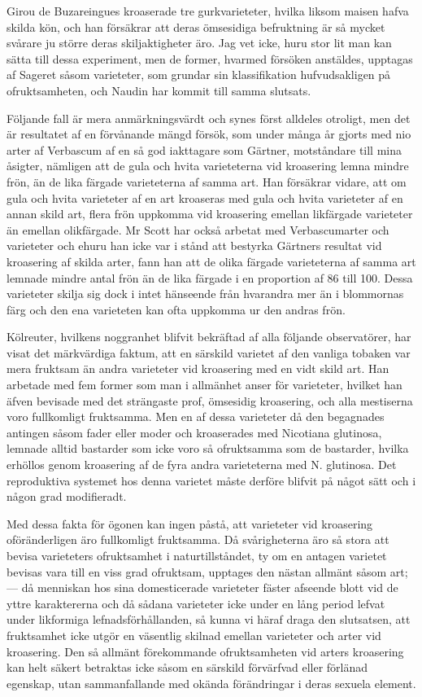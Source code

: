 Girou de Buzareingues kroaserade tre gurkvarieteter, hvilka liksom maisen hafva skilda kön, och han försäkrar att deras ömsesidiga befruktning är så mycket svårare ju större deras skiljaktigheter äro. Jag vet icke, huru stor lit man kan sätta till dessa experiment, men de former, hvarmed försöken anstäldes, upptagas af Sageret såsom varieteter, som grundar sin klassifikation hufvudsakligen på ofruktsamheten, och Naudin har kommit till samma slutsats.

Följande fall är mera anmärkningsvärdt och synes först alldeles otroligt, men det är resultatet af en förvånande mängd försök, som under många år gjorts med nio arter af Verbascum af en så god iakttagare som Gärtner, motståndare till mina åsigter, nämligen att de gula och hvita varieteterna vid kroasering lemna mindre frön, än de lika färgade varieteterna af samma art. Han försäkrar vidare, att om gula och hvita varieteter af en art kroaseras med gula och hvita varieteter af en annan skild art, flera frön uppkomma vid kroasering emellan likfärgade varieteter än emellan olikfärgade. Mr Scott har också arbetat med Verbascumarter och varieteter och ehuru han icke var i stånd att bestyrka Gärtners resultat vid kroasering af skilda arter, fann han att de olika färgade varieteterna af samma art lemnade mindre antal frön än de lika färgade i en proportion af 86 till 100. Dessa varieteter skilja sig dock i intet hänseende från hvarandra mer än i blommornas färg och den ena varieteten kan ofta uppkomma ur den andras frön.

Kölreuter, hvilkens noggranhet blifvit bekräftad af alla följande observatörer, har visat det märkvärdiga faktum, att en särskild varietet af den vanliga tobaken var mera fruktsam än andra varieteter vid kroasering med en vidt skild art. Han arbetade med fem former som man i allmänhet anser för varieteter, hvilket han äfven bevisade med det strängaste prof, ömsesidig kroasering, och alla mestiserna voro fullkomligt fruktsamma. Men en af dessa varieteter då den begagnades antingen såsom fader eller moder och kroaserades med Nicotiana glutinosa, lemnade alltid bastarder som icke voro så ofruktsamma som de bastarder, hvilka erhöllos genom kroasering af de fyra andra varieteterna med N. glutinosa. Det reproduktiva systemet hos denna varietet måste derföre blifvit på något sätt och i någon grad modifieradt.

Med dessa fakta för ögonen kan ingen påstå, att varieteter vid kroasering oföränderligen äro fullkomligt fruktsamma. Då svårigheterna äro så stora att bevisa varieteters ofruktsamhet i naturtillståndet, ty om en antagen varietet bevisas vara till en viss grad ofruktsam, upptages den nästan allmänt såsom art; — då menniskan hos sina domesticerade varieteter fäster afseende blott vid de yttre karaktererna och då sådana varieteter icke under en lång period lefvat under likformiga lefnadsförhållanden, så kunna vi häraf draga den slutsatsen, att fruktsamhet icke utgör en väsentlig skilnad emellan varieteter och arter vid kroasering. Den så allmänt förekommande ofruktsamheten vid arters kroasering kan helt säkert betraktas icke såsom en särskild förvärfvad eller förlänad egenskap, utan sammanfallande med okända förändringar i deras sexuela element.



